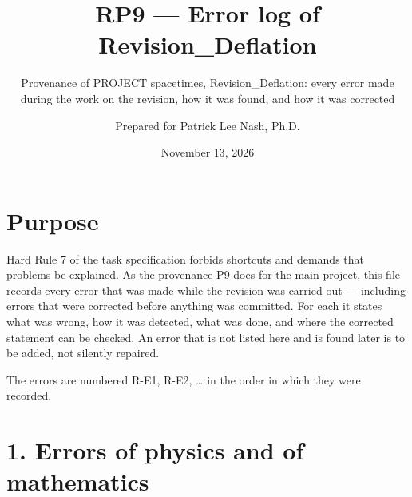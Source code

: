 \documentclass[
  10pt,
]{article}
\title{RP9 --- Error log of Revision\_Deflation}
\subtitle{Provenance of PROJECT spacetimes, Revision\_Deflation: every
error made during the work on the revision, how it was found, and how it
was corrected}
\author{Prepared for Patrick Lee Nash, Ph.D.}
\date{November 13, 2026}
\begin{document}
\maketitle

\hypertarget{purpose}{%
\section{Purpose}\label{purpose}}

Hard Rule 7 of the task specification forbids shortcuts and demands that
problems be explained. As the provenance P9 does for the main project,
this file records every error that was made while the revision was
carried out --- including errors that were corrected before anything was
committed. For each it states what was wrong, how it was detected, what
was done, and where the corrected statement can be checked. An error
that is not listed here and is found later is to be added, not silently
repaired.

The errors are numbered R-E1, R-E2, \ldots{} in the order in which they
were recorded.

\hypertarget{errors-of-physics-and-of-mathematics}{%
\section{1. Errors of physics and of
mathematics}\label{errors-of-physics-and-of-mathematics}}
\end{document}
